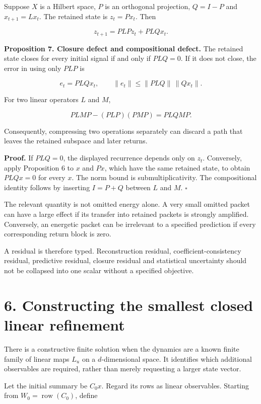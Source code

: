 \documentclass[11pt,letterpaper]{article}
\begin{document}
Suppose \(X\) is a Hilbert space, \(P\) is an orthogonal projection,
\(Q=I-P\) and \(x_{t+1}=Lx_t\). The retained state is \(z_t=Px_t\). Then

\[
z_{t+1}=PLPz_t+PLQx_t.
\]

\textbf{Proposition 7. Closure defect and compositional defect.} The
retained state closes for every initial signal if and only if \(PLQ=0\).
If it does not close, the error in using only \(PLP\) is

\[
e_t=PLQx_t,\qquad
\|e_t\|\leq\|PLQ\|\,\|Qx_t\|.
\]

For two linear operators \(L\) and \(M\),

\[
\boxed{PLMP-(PLP)(PMP)=PLQMP.}
\]

Consequently, compressing two operations separately can discard a path
that leaves the retained subspace and later returns.

\textbf{Proof.} If \(PLQ=0\), the displayed recurrence depends only on
\(z_t\). Conversely, apply Proposition 6 to \(x\) and \(Px\), which have
the same retained state, to obtain \(PLQx=0\) for every \(x\). The norm
bound is submultiplicativity. The compositional identity follows by
inserting \(I=P+Q\) between \(L\) and \(M\). \(\square\)

The relevant quantity is not omitted energy alone. A very small omitted
packet can have a large effect if its transfer into retained packets is
strongly amplified. Conversely, an energetic packet can be irrelevant to
a specified prediction if every corresponding return block is zero.

A residual is therefore typed. Reconstruction residual,
coefficient-consistency residual, predictive residual, closure residual
and statistical uncertainty should not be collapsed into one scalar
without a specified objective.

\section{6. Constructing the smallest closed linear
refinement}\label{constructing-the-smallest-closed-linear-refinement}

There is a constructive finite solution when the dynamics are a known
finite family of linear maps \(L_u\) on a \(d\)-dimensional space. It
identifies which additional observables are required, rather than merely
requesting a larger state vector.

Let the initial summary be \(C_0x\). Regard its rows as linear
observables. Starting from \(W_0=\operatorname{row}(C_0)\), define
\end{document}
